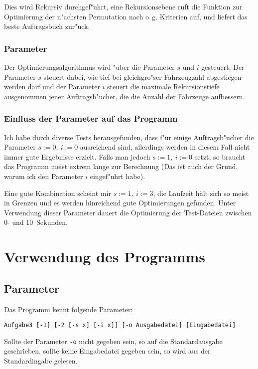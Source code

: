 \documentclass{scrreprt}
\begin{document}
Dies wird Rekursiv durchgef"uhrt, eine Rekursionsebene ruft die Funktion zur
Optimierung der n"achsten Permutation nach o.\,g. Kriterien auf, und liefert das
beste Auftragsbuch zur"uck.

\subsection{Parameter}
Der Optimierungsalgorithmus wird "uber die Parameter $s$ und $i$ gesteuert. Der
Parameter $s$ steuert dabei, wie tief bei gleichgro"ser Fahrzeugzahl abgestiegen
werden darf und der Parameter $i$ steuert die maximale Rekursionstiefe
ausgenommen jener Auftragsb"ucher, die die Anzahl der Fahrzeuge aufbessern.

\subsection{Einfluss der Parameter auf das Programm}
Ich habe durch diverse Tests herausgefunden, dass f"ur einige Auftragsb"ucher
die Parameter $s := 0,\ i := 0$ ausreichend sind, allerdings werden in diesem
Fall nicht immer gute Ergebnisse erzielt.  Falls man jedoch $s := 1,\ i := 0$
setzt, so braucht das Programm meist extrem lange zur Berechnung (Das ist auch
der Grund, warum ich den Parameter $i$ eingef"uhrt habe).

Eine gute Kombination scheint mir $s := 1,\ i := 3$, die Laufzeit hält sich so
meist in Grenzen und es werden hinreichend gute Optimierungen gefunden.  Unter
Verwendung dieser Parameter dauert die Optimierung der Test-Dateien zwischen 0-
und 10\ Sekunden.

\chapter{Verwendung des Programms}

\section{Parameter}
Das Programm kennt folgende Parameter:

\begin{verbatim}
Aufgabe3 [-1] [-2 [-s x] [-i x]] [-o Ausgabedatei] [Eingabedatei]
\end{verbatim}

Sollte der Parameter \texttt{-o} nicht gegeben sein, so auf die Standardausgabe
geschrieben, sollte keine Eingabedatei gegeben sein, so wird aus der
Standardingabe gelesen.
\end{document}
